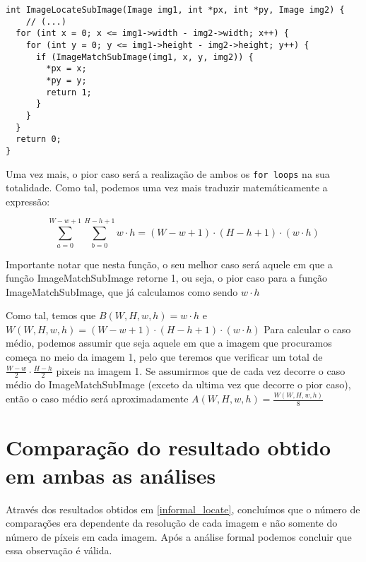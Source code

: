 \begin{listing}[H]
  \begin{verbatim}
int ImageLocateSubImage(Image img1, int *px, int *py, Image img2) {
    // (...)
  for (int x = 0; x <= img1->width - img2->width; x++) {
    for (int y = 0; y <= img1->height - img2->height; y++) {
      if (ImageMatchSubImage(img1, x, y, img2)) {
        *px = x;
        *py = y;
        return 1;
      }
    }
  }
  return 0;
}
  \end{verbatim}
\end{listing}

Uma vez mais, o pior caso será a realização de ambos os
\verb|for loops| na sua totalidade. Como tal, podemos
uma vez mais traduzir matemáticamente a expressão:

\begin{equation}
\sum_{a=0}^{W-w+1}\sum_{b=0}^{H-h+1}w\cdot h = (W-w+1)\cdot(H-h+1)\cdot(w\cdot h) 
\end{equation}

Importante notar que nesta função, o seu melhor caso será
aquele em que a função ImageMatchSubImage retorne 1, ou
seja, o pior caso para a função ImageMatchSubImage, que já
calculamos como sendo $w \cdot h$

Como tal, temos que $B(W,H,w,h) = w\cdot h$ e $W(W,H,w,h) = (W-w+1)\cdot(H-h+1)\cdot(w\cdot h)$
Para calcular o caso médio, podemos assumir que seja aquele
em que a imagem que procuramos começa no meio da imagem 1,
pelo que teremos que verificar um total de $\frac{W - w}{2}
\cdot \frac{H-h}{2}$ pixeis na imagem 1. Se assumirmos que de
cada vez decorre o caso médio do ImageMatchSubImage (exceto
da ultima vez que decorre o pior caso), então o caso médio
será aproximadamente $A(W,H,w,h) = \frac{W(W,H,w,h)}{8}$

\section{Comparação do resultado obtido em ambas as análises}

Através dos resultados obtidos em \ref{informal_locate},
concluímos que o número de comparações era dependente da
resolução de cada imagem e não somente do número de píxeis
em cada imagem. Após a análise formal podemos concluir que
essa observação é válida.
